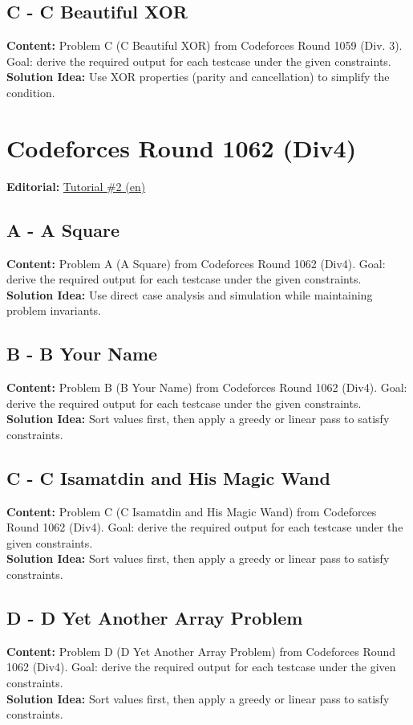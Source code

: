 \documentclass[11pt]{article}
\begin{document}
\subsection{C - C Beautiful XOR}
\textbf{Content:} Problem C (C Beautiful XOR) from Codeforces Round 1059 (Div. 3). Goal: derive the required output for each testcase under the given constraints.\\
\textbf{Solution Idea:} Use XOR properties (parity and cancellation) to simplify the condition.

\section{Codeforces Round 1062 (Div4)}
\textbf{Editorial:} \href{https://codeforces.com/blog/entry/147869}{Tutorial \#2 (en)}

\subsection{A - A Square}
\textbf{Content:} Problem A (A Square) from Codeforces Round 1062 (Div4). Goal: derive the required output for each testcase under the given constraints.\\
\textbf{Solution Idea:} Use direct case analysis and simulation while maintaining problem invariants.

\subsection{B - B Your Name}
\textbf{Content:} Problem B (B Your Name) from Codeforces Round 1062 (Div4). Goal: derive the required output for each testcase under the given constraints.\\
\textbf{Solution Idea:} Sort values first, then apply a greedy or linear pass to satisfy constraints.

\subsection{C - C Isamatdin and His Magic Wand}
\textbf{Content:} Problem C (C Isamatdin and His Magic Wand) from Codeforces Round 1062 (Div4). Goal: derive the required output for each testcase under the given constraints.\\
\textbf{Solution Idea:} Sort values first, then apply a greedy or linear pass to satisfy constraints.

\subsection{D - D Yet Another Array Problem}
\textbf{Content:} Problem D (D Yet Another Array Problem) from Codeforces Round 1062 (Div4). Goal: derive the required output for each testcase under the given constraints.\\
\textbf{Solution Idea:} Sort values first, then apply a greedy or linear pass to satisfy constraints.
\end{document}
